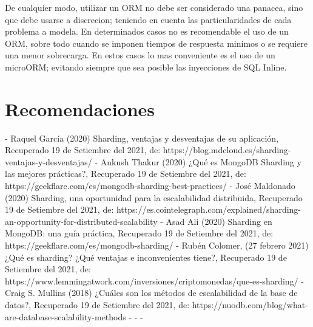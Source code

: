 \documentclass[twoside,twocolumn]{article}
\begin{document}
De cualquier modo, utilizar un ORM no debe ser considerado una panacea, sino que debe usarse a discrecion; teniendo en cuenta las 
particularidades de cada problema a modela. En determinados casos no es recomendable el uso de un ORM,
sobre todo cuando se imponen tiempos de respuesta minimos o se requiere una menor sobrecarga. En estos casos lo mas conveniente es el uso de un 
microORM; evitando siempre que sea posible las inyecciones de SQL Inline.
\section{Recomendaciones}

\begin{thebibliography}{XXX0000}
	\bibitem - Raquel García (2020) Sharding, ventajas y desventajas de su aplicación, Recuperado 19 de Setiembre del 2021, de: https://blog.mdcloud.es/sharding-ventajas-y-desventajas/ 
	\bibitem - Ankush Thakur (2020) ¿Qué es MongoDB Sharding y las mejores prácticas?, Recuperado 19 de Setiembre del 2021, de: https://geekflare.com/es/mongodb-sharding-best-practices/
	\bibitem - José Maldonado (2020) Sharding, una oportunidad para la escalabilidad distribuida, Recuperado 19 de Setiembre del 2021, de: https://es.cointelegraph.com/explained/sharding-an-opportunity-for-distributed-scalability 
	\bibitem - Asad Ali (2020) Sharding en MongoDB: una guía práctica, Recuperado 19 de Setiembre del 2021, de: https://geekflare.com/es/mongodb-sharding/
	\bibitem - Rubén Colomer, (27 febrero 2021) ¿Qué es sharding? ¿Qué ventajas e inconvenientes tiene?, Recuperado 19 de Setiembre del 2021, de: https://www.lemmingatwork.com/inversiones/criptomonedas/que-es-sharding/  
	\bibitem - Craig S. Mullins (2018) ¿Cuáles son los métodos de escalabilidad de la base de datos?, Recuperado 19 de Setiembre del 2021, de: https://nuodb.com/blog/what-are-database-scalability-methods 
	\bibitem - 
	\bibitem - 
	\bibitem - 
	\end{thebibliography}

\end{document}
